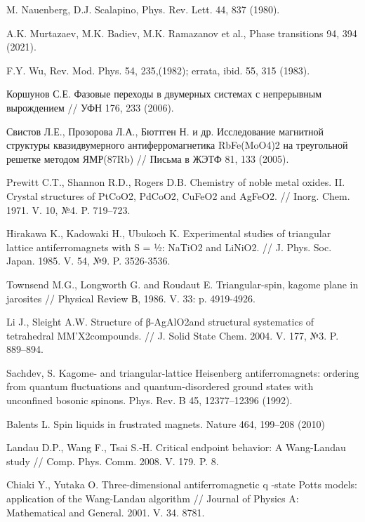 \begin{thebibliography}{111}
M. Nauenberg, D.J. Scalapino, Phys. Rev. Lett. 44, 837 (1980).

A.K. Murtazaev, M.K. Badiev, M.K. Ramazanov et al., Phase transitions 94, 394 (2021).

F.Y. Wu, Rev. Mod. Phys. 54, 235,(1982); errata, ibid. 55, 315 (1983).




Коршунов С.Е. Фазовые переходы в двумерных системах с непрерывным вырождением // УФН 176, 233 (2006).

Свистов Л.Е., Прозорова Л.А., Бюттген Н. и др. Исследование магнитной структуры квазидвумерного антиферромагнетика RbFe(MoO4)2 на треугольной решетке методом ЯМР(87Rb) // Письма в ЖЭТФ 81, 133 (2005).

Prewitt C.T., Shannon R.D., Rogers D.B. Chemistry of noble metal oxides. II. Crystal structures of PtCoO2, PdCoO2, CuFeO2 and AgFeO2. // Inorg. Chem. 1971. V. 10, №4. P. 719--723.

Hirakawa K., Kadowaki H., Ubukoch K. Experimental studies of triangular lattice antiferromagnets with S = ½: NaTiO2 and LiNiO2. // J. Phys. Soc. Japan. 1985. V. 54, №9. P. 3526-3536.

Townsend M.G., Longworth G. and Roudaut E. Triangular-spin, kagome plane in jarosites // Physical Review В, 1986. V. 33: p. 4919-4926.

Li J., Sleight A.W. Structure of β-AgAlO2and structural systematics of tetrahedral MM’X2compounds. // J. Solid State Chem. 2004.  V. 177, №3. P. 889--894.

Sachdev, S. Kagome- and triangular-lattice Heisenberg antiferromagnets: ordering from quantum fluctuations and quantum-disordered ground states with unconfined bosonic spinons. Phys. Rev. B 45, 12377--12396 (1992).

Balents L. Spin liquids in frustrated magnets. Nature 464, 199--208 (2010)

Landau D.P., Wang F., Tsai S.-H. Critical endpoint behavior: A Wang-Landau study // Comp. Phys. Comm. 2008. V. 179. P. 8.

Chiaki Y., Yutaka O. Three-dimensional antiferromagnetic q -state Potts models: application of the Wang-Landau algorithm // Journal of Physics A: Mathematical and General. 2001. V. 34. 8781.


\end{thebibliography}
